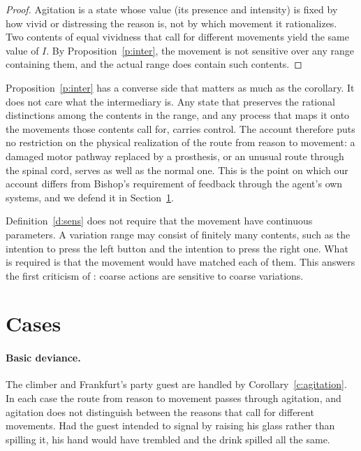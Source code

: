 \documentclass{situationist-preprint}
\begin{document}
\begin{proof}
Agitation is a state whose value (its presence and intensity) is fixed by how vivid or distressing the reason is, not by which movement it rationalizes. Two contents of equal vividness that call for different movements yield the same value of $I$. By Proposition~\ref{p:inter}, the movement is not sensitive over any range containing them, and the actual range does contain such contents.
\end{proof}

Proposition~\ref{p:inter} has a converse side that matters as much as the corollary. It does not care what the intermediary is. Any state that preserves the rational distinctions among the contents in the range, and any process that maps it onto the movements those contents call for, carries control. The account therefore puts no restriction on the physical realization of the route from reason to movement: a damaged motor pathway replaced by a prosthesis, or an unusual route through the spinal cord, serves as well as the normal one. This is the point on which our account differs from Bishop's requirement of feedback through the agent's own systems, and we defend it in Section~\ref{s:cases}.

\begin{remark}\label{r:coarse}
Definition~\ref{d:sens} does not require that the movement have continuous parameters. A variation range may consist of finitely many contents, such as the intention to press the left button and the intention to press the right one. What is required is that the movement would have matched each of them. This answers the first criticism of \citet{Peacocke1979}: coarse actions are sensitive to coarse variations.
\end{remark}

\section{Cases}\label{s:cases}

\paragraph{Basic deviance.} The climber and Frankfurt's party guest are handled by Corollary~\ref{c:agitation}. In each case the route from reason to movement passes through agitation, and agitation does not distinguish between the reasons that call for different movements. Had the guest intended to signal by raising his glass rather than spilling it, his hand would have trembled and the drink spilled all the same.
\end{document}
